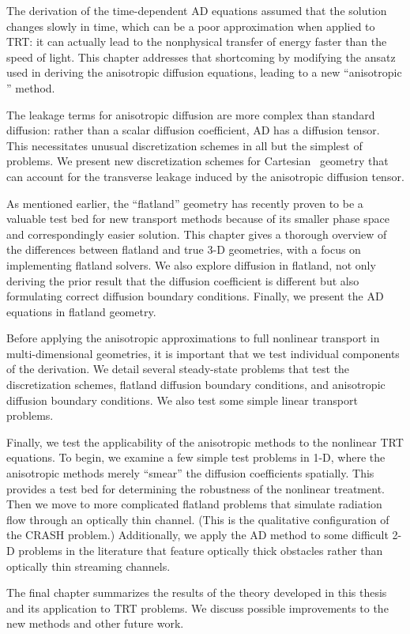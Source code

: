 The derivation of the time-dependent AD equations assumed that the solution
changes slowly in time, which can be a poor approximation when applied to
TRT: it can actually lead to the nonphysical transfer of energy faster than the
speed of
light. This chapter addresses that shortcoming by modifying the ansatz used in
deriving the anisotropic diffusion equations, leading to a new ``anisotropic
\Pone'' method.

The leakage terms for anisotropic diffusion are more complex than standard
diffusion: rather than a scalar diffusion coefficient, AD has a diffusion
tensor. This necessitates unusual discretization schemes in all but the simplest
of problems. We present new discretization schemes for Cartesian \xy\ geometry
that can account for the transverse leakage induced by the anisotropic diffusion
tensor.

As mentioned earlier, the ``flatland'' geometry has recently proven to be a
valuable test bed for new transport methods because of its smaller phase space
and correspondingly easier solution. This chapter gives a thorough overview of
the differences between flatland and true 3-D geometries, with a focus on
implementing flatland solvers. We also explore diffusion in flatland, not only
deriving the prior result that the diffusion coefficient is different but also
formulating correct diffusion boundary conditions. Finally, we present the AD
equations in flatland geometry.

Before applying the anisotropic approximations to full nonlinear transport in
multi-dimensional geometries, it is important that we test individual components
of the derivation. We detail several steady-state problems that test the
discretization schemes, flatland diffusion boundary conditions, and anisotropic
diffusion boundary conditions. We also test some simple linear transport
problems.

Finally, we test the applicability of the anisotropic methods to the nonlinear
TRT equations. To begin, we examine a few simple test problems in 1-D, where the
anisotropic methods merely ``smear'' the diffusion coefficients spatially.
This provides a test bed for determining the robustness of the nonlinear
treatment. Then
we move to more complicated flatland problems that simulate radiation flow
through an optically thin channel. (This is the qualitative configuration of
the CRASH problem.)
Additionally, we apply the AD method to some difficult 2-D problems in the
literature that feature optically thick obstacles rather than optically thin
streaming channels.

The final chapter summarizes the results of the theory developed in this thesis
and its application to TRT problems. We discuss possible improvements to the new
methods and other future work.

